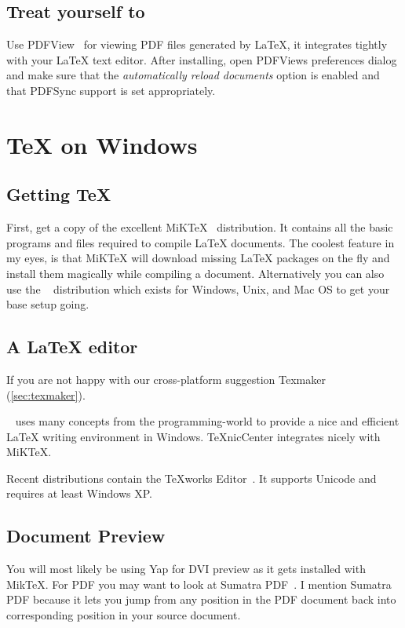 \subsection{Treat yourself to }

Use PDFView~\cite{pdfview} for viewing PDF files generated by \LaTeX{}, it integrates tightly
with your \LaTeX{} text editor. After installing, open
PDFViews preferences dialog and make sure that the \emph{automatically reload
  documents} option is enabled and that PDFSync support is set appropriately.

\section{\TeX{} on Windows}

\subsection{Getting \TeX{}}

First, get a copy of the excellent MiK\TeX{}~\cite{miktex} distribution.
It contains all the basic programs and files
required to compile \LaTeX{} documents.  The coolest feature in my eyes, is
that MiK\TeX{} will download missing \LaTeX{} packages on the fly and install them
magically while compiling a document. Alternatively you can also use
the \TeXLive~\cite{texlive} distribution which exists for Windows, Unix, and Mac OS to
get your base setup going.

\subsection{A \LaTeX{} editor}

If you are not happy with our cross-platform suggestion Texmaker
(\autoref{sec:texmaker}).

~\cite{texniccenter} uses many concepts from the programming-world to provide a nice and
efficient \LaTeX{} writing environment in Windows. TeXnicCenter integrates nicely with
MiKTeX.

Recent \TeXLive{} distributions contain the \TeX{}works Editor~\cite{texworks}.
It supports Unicode and requires at least Windows XP\@.

\subsection{Document Preview}

You will most likely be using Yap for DVI preview as it gets installed with
MikTeX. For PDF you may want to look at Sumatra
PDF~\cite{sumatrapdf}. I mention Sumatra PDF
because it lets you jump from any position in the PDF document back into
corresponding position in your source document.

